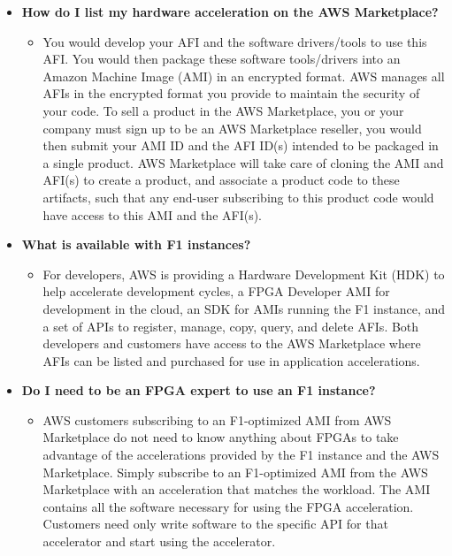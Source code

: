 \documentclass[a4paper]{article}
\begin{document}
\begin{itemize}
        \item[\ding{42}]
        \label{How do I list my hardware acceleration on the AWS Marketplace?}
        \hypertarget{How do I list my hardware acceleration on the AWS Marketplace?}{\textbf{How do I list my hardware acceleration on the AWS Marketplace?}}
        \begin{itemize}
            \item[\ding{45}] You would develop your AFI and the software drivers/tools to use this AFI. You would then package these software tools/drivers into an Amazon Machine Image (AMI) in an encrypted format. AWS manages all AFIs in the encrypted format you provide to maintain the security of your code. To sell a product in the AWS Marketplace, you or your company must sign up to be an AWS Marketplace reseller, you would then submit your AMI ID and the AFI ID(s) intended to be packaged in a single product. AWS Marketplace will take care of cloning the AMI and AFI(s) to create a product, and associate a product code to these artifacts, such that any end-user subscribing to this product code would have access to this AMI and the AFI(s).
        \end{itemize}

        \item[\ding{42}]
        \label{What is available with F1 instances?}
        \hypertarget{What is available with F1 instances?}{\textbf{What is available with F1 instances?}}
        \begin{itemize}
            \item[\ding{45}] For developers, AWS is providing a Hardware Development Kit (HDK) to help accelerate development cycles, a FPGA Developer AMI for development in the cloud, an SDK for AMIs running the F1 instance, and a set of APIs to register, manage, copy, query, and delete AFIs. Both developers and customers have access to the AWS Marketplace where AFIs can be listed and purchased for use in application accelerations.
        \end{itemize}

        \item[\ding{42}]
        \label{Do I need to be an FPGA expert to use an F1 instance?}
        \hypertarget{Do I need to be an FPGA expert to use an F1 instance?}{\textbf{Do I need to be an FPGA expert to use an F1 instance?}}
        \begin{itemize}
            \item[\ding{45}] AWS customers subscribing to an F1-optimized AMI from AWS Marketplace do not need to know anything about FPGAs to take advantage of the accelerations provided by the F1 instance and the AWS Marketplace. Simply subscribe to an F1-optimized AMI from the AWS Marketplace with an acceleration that matches the workload. The AMI contains all the software necessary for using the FPGA acceleration. Customers need only write software to the specific API for that accelerator and start using the accelerator.
        \end{itemize}


\end{itemize}
\end{document}
